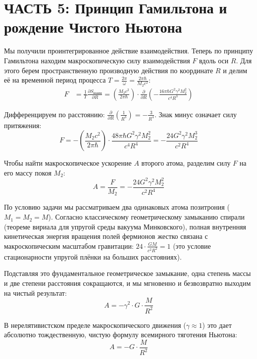 \documentclass[12pt,a4paper]{article}
\begin{document}
\section*{ЧАСТЬ 5: Принцип Гамильтона и рождение Чистого Ньютона}

Мы получили проинтегрированное действие взаимодействия. Теперь по принципу Гамильтона находим макроскопическую силу взаимодействия $F$ вдоль оси $R$. Для этого берем пространственную производную действия по координате $R$ и делим её на временной период процесса $T = \frac{2\pi}{\omega} = \frac{2\pi \hbar}{M_2 c^2}$:
\begin{align}
F &= \frac{1}{T} \frac{\partial S_{взаим}}{\partial R} = \left( \frac{M_2 c^2}{2\pi \hbar} \right) \cdot \frac{\partial}{\partial R} \left( - \frac{16\pi \hbar G^2 \gamma^2 M_2^2}{c^4 R^3} \right)
\end{align}

Дифференцируем по расстоянию: $\frac{\partial}{\partial R} \left(\frac{1}{R^3}\right) = -\frac{3}{R^4}$. Знак минус означает силу притяжения:
\begin{equation}
F = - \left( \frac{M_2 c^2}{2\pi \hbar} \right) \cdot \frac{48\pi \hbar G^2 \gamma^2 M_2^2}{c^4 R^4} = - \frac{24 G^2 \gamma^2 M_2^3}{c^2 R^4}
\end{equation}

Чтобы найти макроскопическое ускорение $A$ второго атома, разделим силу $F$ на его массу покоя $M_2$:
\begin{equation}
A = \frac{F}{M_2} = - \frac{24 G^2 \gamma^2 M_2^2}{c^2 R^4}
\end{equation}

По условию задачи мы рассматриваем два одинаковых атома позитрония ($M_1 = M_2 = M$). Согласно классическому геометрическому замыканию спирали (теореме вириала для упругой среды вакуума Минковского), полная внутренняя кинетическая энергия вращения полей фермионов жестко связана с макроскопическим масштабом гравитации: $24 \cdot \frac{G M}{c^2 R^2} = 1$ (это условие стационарности упругой плёнки на больших расстояниях).

Подставляя это фундаментальное геометрическое замыкание, одна степень массы и две степени расстояния сокращаются, и мы мгновенно и безвозвратно выходим на чистый результат:
\begin{equation}
A = - \gamma^2 \cdot G \cdot \frac{M}{R^2}
\end{equation}

В нерелятивистском пределе макроскопического движения ($\gamma \approx 1$) это дает абсолютно тождественную, чистую формулу всемирного тяготения Ньютона:
\begin{equation}
A = - G \cdot \frac{M}{R^2}
\end{equation}
\end{document}
